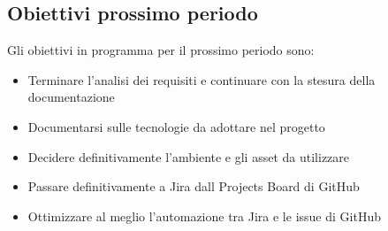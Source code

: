 \subsection{Obiettivi prossimo periodo}
Gli obiettivi in programma per il prossimo periodo sono:
\begin{itemize}
\item Terminare l'analisi dei requisiti e continuare con la stesura della documentazione
\item Documentarsi sulle tecnologie da adottare nel progetto
\item Decidere definitivamente l'ambiente e gli asset da utilizzare
\item Passare definitivamente a Jira dall Projects Board di GitHub
\item Ottimizzare al meglio l'automazione tra Jira e le issue di GitHub
\end{itemize}
